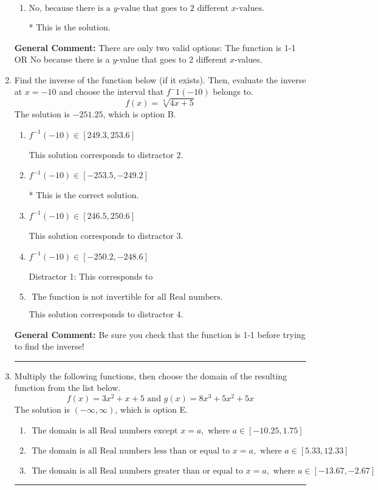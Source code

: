 \documentclass{extbook}[14pt]
\newcommand{\litem}[1]{\item #1

\rule{\textwidth}{0.4pt}}
\begin{document}
\begin{enumerate}
{\begin{enumerate}[label=\Alph*.]
Corresponds to believing 1-1 means the range is all Real numbers.
\item \( \text{No, because there is a $y$-value that goes to 2 different $x$-values.} \)

* This is the solution.
\end{enumerate}

\textbf{General Comment:} There are only two valid options: The function is 1-1 OR No because there is a $y$-value that goes to 2 different $x$-values.
}
\litem{
Find the inverse of the function below (if it exists). Then, evaluate the inverse at $x = -10$ and choose the interval that $f^-1(-10)$ belongs to.
\[ f(x) = \sqrt[3]{4 x + 5} \]The solution is \( -251.25 \), which is option B.\begin{enumerate}[label=\Alph*.]
\item \( f^{-1}(-10) \in [249.3, 253.6] \)

 This solution corresponds to distractor 2.
\item \( f^{-1}(-10) \in [-253.5, -249.2] \)

* This is the correct solution.
\item \( f^{-1}(-10) \in [246.5, 250.6] \)

 This solution corresponds to distractor 3.
\item \( f^{-1}(-10) \in [-250.2, -248.6] \)

 Distractor 1: This corresponds to 
\item \( \text{ The function is not invertible for all Real numbers. } \)

 This solution corresponds to distractor 4.
\end{enumerate}

\textbf{General Comment:} Be sure you check that the function is 1-1 before trying to find the inverse!
}
\litem{
Multiply the following functions, then choose the domain of the resulting function from the list below.
\[ f(x) = 3x^{2} +x + 5 \text{ and } g(x) = 8x^{3} +5 x^{2} +5 x \]The solution is \( (-\infty, \infty) \), which is option E.\begin{enumerate}[label=\Alph*.]
\item \( \text{ The domain is all Real numbers except } x = a, \text{ where } a \in [-10.25, 1.75] \)


\item \( \text{ The domain is all Real numbers less than or equal to } x = a, \text{ where } a \in [5.33, 12.33] \)


\item \( \text{ The domain is all Real numbers greater than or equal to } x = a, \text{ where } a \in [-13.67, -2.67] \)



\end{enumerate}}
\end{enumerate}
\end{document}

